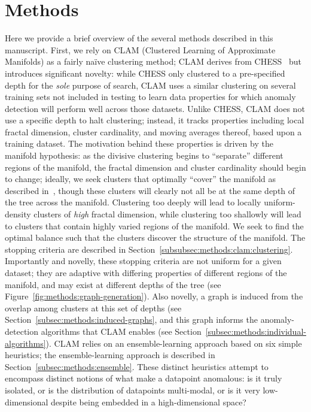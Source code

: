 \section{Methods}
\label{sec:methods}
\label{subsec:methods:overview}

Here we provide a brief overview of the several methods described in this manuscript.
First, we rely on CLAM (Clustered Learning of Approximate Manifolds) as a fairly na\"ive clustering method; CLAM derives from CHESS~\cite{ishaq2019clustered} but introduces significant novelty: while CHESS only clustered to a pre-specified depth for the \emph{sole} purpose of search, CLAM uses a similar clustering on several training sets not included in testing to learn data properties for which anomaly detection will perform well across those datasets.
Unlike CHESS, CLAM does not use a specific depth to halt clustering; instead, it tracks properties including local fractal dimension, cluster cardinality, and moving averages thereof, based upon a training dataset.
The motivation behind these properties is driven by the manifold hypothesis: as the divisive clustering begins to ``separate'' different regions of the manifold, the fractal dimension and cluster cardinality should begin to change; ideally, we seek clusters that optimally ``cover'' the manifold as described in~\cite{yu2015entropy}, though these clusters will clearly not all be at the same depth of the tree across the manifold.
Clustering too deeply will lead to locally uniform-density clusters of \emph{high} fractal dimension, while clustering too shallowly will lead to clusters that contain highly varied regions of the manifold.
We seek to find the optimal balance such that the clusters discover the structure of the manifold.
The stopping criteria are described in Section~\ref{subsubsec:methods:clam:clustering}.
Importantly and novelly, these stopping criteria are not uniform for a given dataset; they are adaptive with differing properties of different regions of the manifold, and may exist at different depths of the tree (see Figure~\ref{fig:methods:graph-generation}).
Also novelly, a graph is induced from the overlap among clusters at this set of depths (see Section~\ref{subsec:methods:induced-graphs}, and this graph informs the anomaly-detection algorithms that CLAM enables (see Section~\ref{subsec:methods:individual-algorithms}).
CLAM relies on an ensemble-learning approach based on six simple heuristics; the ensemble-learning approach is described in Section~\ref{subsec:methods:ensemble}.
These distinct heuristics attempt to encompass distinct notions of what make a datapoint anomalous: is it truly isolated, or is the distribution of datapoints multi-modal, or is it very low-dimensional despite being embedded in a high-dimensional space?

